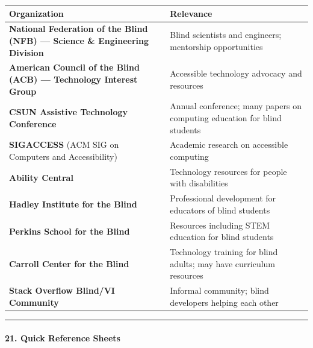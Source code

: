 \documentclass[
  justified,
  openright,
]{tufte-book}
\let\subsection\paragraph
\let\paragraph\paragraph
\let\subsection\paragraph
\let\paragraph\paragraph
\begin{document}
\begin{fullwidth}{\def\LTcaptype{none} %
\begin{longtable}[]{@{}
  >{\raggedright\arraybackslash}p{}
  >{\raggedright\arraybackslash}p{}@{}}
\toprule\noalign{}
\begin{minipage}[b]{\linewidth}\raggedright
Organization
\end{minipage} & \begin{minipage}[b]{\linewidth}\raggedright
Relevance
\end{minipage} \\
\midrule\noalign{}
\endhead
\bottomrule\noalign{}
\endlastfoot
\textbf{National Federation of the Blind (NFB) --- Science \&
Engineering Division} & Blind scientists and engineers; mentorship
opportunities \\
\textbf{American Council of the Blind (ACB) --- Technology Interest
Group} & Accessible technology advocacy and resources \\
\textbf{CSUN Assistive Technology Conference} & Annual conference; many
papers on computing education for blind students \\
\textbf{SIGACCESS} (ACM SIG on Computers and Accessibility) & Academic
research on accessible computing \\
\textbf{Ability Central} & Technology resources for people with
disabilities \\
\textbf{Hadley Institute for the Blind} & Professional development for
educators of blind students \\
\textbf{Perkins School for the Blind} & Resources including STEM
education for blind students \\
\textbf{Carroll Center for the Blind} & Technology training for blind
adults; may have curriculum resources \\
\textbf{Stack Overflow Blind/VI Community} & Informal community; blind
developers helping each other \\
\end{longtable}
}
\end{fullwidth}

\begin{center}\rule{0.5\linewidth}{0.5pt}\end{center}

\subsection{21. Quick Reference Sheets}\label{quick-reference-sheets}
\end{document}
